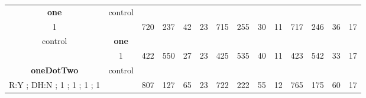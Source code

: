 \begin{table}[]
{\begin{tabular}{|c|c|c|c|c|c|c|c|c|c|c|c|c|c|}
\cellcolor{blue!15}\textbf{one} & control& {\color[HTML]{00009B} } & {\color[HTML]{9A0000} } & {\color[HTML]{009901} } &  & {\color[HTML]{00009B} } & {\color[HTML]{9A0000} } & {\color[HTML]{009901} } &  & {\color[HTML]{00009B} } & {\color[HTML]{9A0000} } & {\color[HTML]{009901} } &  \\ 
\cellcolor{ blue!15}1 &  & \multirow{-2}{*}{{\color[HTML]{00009B} 720}} & \multirow{-2}{*}{{\color[HTML]{9A0000} 237}} & \multirow{-2}{*}{{\color[HTML]{009901} 42}} & \multirow{-2}{*}{23} & \multirow{-2}{*}{{\color[HTML]{00009B} 715}} & \multirow{-2}{*}{{\color[HTML]{9A0000} 255}} & \multirow{-2}{*}{{\color[HTML]{009901} 30}} & \multirow{-2}{*}{11} & \multirow{-2}{*}{{\color[HTML]{00009B} 717}} & \multirow{-2}{*}{{\color[HTML]{9A0000} 246}} & \multirow{-2}{*}{{\color[HTML]{009901} 36}} & \multirow{-2}{*}{17} \\ \hline

control & \cellcolor{blue!15}\textbf{one}& {\color[HTML]{00009B} } & {\color[HTML]{9A0000} } & {\color[HTML]{009901} } &  & {\color[HTML]{00009B} } & {\color[HTML]{9A0000} } & {\color[HTML]{009901} } &  & {\color[HTML]{00009B} } & {\color[HTML]{9A0000} } & {\color[HTML]{009901} } &  \\ 
 & \cellcolor{ blue!15}1 & \multirow{-2}{*}{{\color[HTML]{00009B} 422}} & \multirow{-2}{*}{{\color[HTML]{9A0000} 550}} & \multirow{-2}{*}{{\color[HTML]{009901} 27}} & \multirow{-2}{*}{23} & \multirow{-2}{*}{{\color[HTML]{00009B} 425}} & \multirow{-2}{*}{{\color[HTML]{9A0000} 535}} & \multirow{-2}{*}{{\color[HTML]{009901} 40}} & \multirow{-2}{*}{11} & \multirow{-2}{*}{{\color[HTML]{00009B} 423}} & \multirow{-2}{*}{{\color[HTML]{9A0000} 542}} & \multirow{-2}{*}{{\color[HTML]{009901} 33}} & \multirow{-2}{*}{17} \\ \hline


\cellcolor{blue!15}\textbf{oneDotTwo} & control& {\color[HTML]{00009B} } & {\color[HTML]{9A0000} } & {\color[HTML]{009901} } &  & {\color[HTML]{00009B} } & {\color[HTML]{9A0000} } & {\color[HTML]{009901} } &  & {\color[HTML]{00009B} } & {\color[HTML]{9A0000} } & {\color[HTML]{009901} } &  \\ 
\cellcolor{ blue!15}R:Y ; DH:N ; 1 ; 1 ; 1 ; 1 &  & \multirow{-2}{*}{{\color[HTML]{00009B} 807}} & \multirow{-2}{*}{{\color[HTML]{9A0000} 127}} & \multirow{-2}{*}{{\color[HTML]{009901} 65}} & \multirow{-2}{*}{23} & \multirow{-2}{*}{{\color[HTML]{00009B} 722}} & \multirow{-2}{*}{{\color[HTML]{9A0000} 222}} & \multirow{-2}{*}{{\color[HTML]{009901} 55}} & \multirow{-2}{*}{12} & \multirow{-2}{*}{{\color[HTML]{00009B} 765}} & \multirow{-2}{*}{{\color[HTML]{9A0000} 175}} & \multirow{-2}{*}{{\color[HTML]{009901} 60}} & \multirow{-2}{*}{17} \\ \hline


\end{tabular}}
\end{table}
